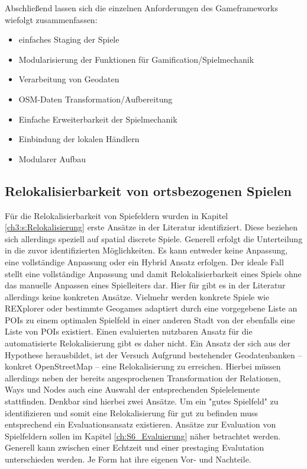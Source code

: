 Abschließend lassen sich die einzelnen Anforderungen des Gameframeworks wiefolgt zusammenfassen:

\begin{itemize}
\item einfaches Staging der Spiele
\item Modularisierung der Funktionen für Gamification/Spielmechanik
\item Verarbeitung von Geodaten
\item OSM-Daten Transformation/Aufbereitung
\item Einfache Erweiterbarkeit der Spielmechanik
\item Einbindung der lokalen Händlern
\item Modularer Aufbau
\end{itemize}


\subsection*{Relokalisierbarkeit von ortsbezogenen Spielen}

Für die Relokalisierbarkeit von Spiefeldern wurden in Kapitel \ref{ch3:s:Relokalisierung} erste Ansätze in der Literatur identifiziert. Diese beziehen sich allerdings speziell auf spatial discrete Spiele.
Generell erfolgt die Unterteilung in die zuvor identifizierten Möglichkeiten.
Es kann entweder keine Anpassung, eine vollständige Anpassung oder ein Hybrid Ansatz erfolgen. Der ideale Fall stellt eine vollständige Anpassung und damit Relokalisierbarkeit eines Spiels ohne das manuelle Anpassen eines Spielleiters dar. Hier für gibt es in der Literatur allerdings keine konkreten Ansätze. Vielmehr werden konkrete Spiele wie REXplorer \cite{Ballagas.2007} oder bestimmte Geogames \cite{Kiefer.2007} adaptiert durch eine vorgegebene Liste an POIs zu einem optimalen Spielfeld in einer anderen Stadt von der ebenfalls eine Liste von POIs existiert.
Einen evaluierten nutzbaren Ansatz für die automatisierte Relokalisierung gibt es daher nicht.
Ein Ansatz der sich aus der Hypothese herausbildet, ist der Versuch Aufgrund bestehender Geodatenbanken -- konkret OpenStreetMap -- eine Relokalisierung zu erreichen. Hierbei müssen allerdings neben der bereits angesprochenen Transformation der Relationen, Ways und Nodes auch eine Auswahl der entsprechenden Spielelemente stattfinden. Denkbar sind hierbei zwei Ansätze. Um ein "gutes Spielfeld" zu identifizieren und somit eine Relokalisierung für gut zu befinden muss entsprechend ein Evaluationsansatz existieren. Ansätze zur Evaluation von Spielfeldern sollen im Kapitel \ref{ch:S6_Evaluierung} näher betrachtet werden. Generell kann zwischen einer Echtzeit und einer prestaging Evalutation unterschieden werden. Je Form hat ihre eigenen Vor- und Nachteile.

